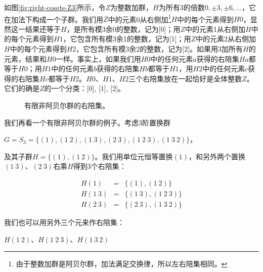 \documentclass[b5paper]{ctexart}
\begin{document}
如图\ref{fig:right-cosets-Z3}所示，令$Z$为整数加群，$H$为所有3的倍数$0, \pm 3, \pm 6, ...$，它在加法下构成一个子群。我们用$Z$中的元素0从右侧加\footnote{由于整数加群是阿贝尔群，加法满足交换律，所以左右陪集相同。}$H$中的每个元素得到$H0$，显然这一结果还等于$H$，是所有模3余0的整数，记为[0]；用$Z$中的元素1从右侧加$H$中的每个元素得到$H1$，它包含所有模3余1的整数，记为[1]；用$Z$中的元素2从右侧加$H$中的每个元素得到$H2$，它包含所有模3余2的整数，记为[2]。如果用3加所有$H$的元素，结果和$H0$一样。事实上，如果我们用$H0$中的任何元素$a$获得的右陪集$Ha$都等于$H0$；用$H1$中的任何元素$b$获得的右陪集$Hb$都等于$H1$，用$H2$中的任何元素$c$获得的右陪集$Hc$都等于$H2$。$H0$、$H1$、$H2$三个右陪集放在一起恰好是全体整数$Z$。它们的确是$Z$的一个分类：[0], [1], [2]。

\begin{figure}[htbp]
\centering
{}
\caption{有限非阿贝尔群的右陪集。}
\label{fig:right-cosets-S3}
\end{figure}

我们再看一个有限非阿贝尔群的例子。考虑3阶置换群

$G = S_3 = \{(1), (1\ 2), (1\ 3), (2\ 3), (1\ 2\ 3), (1\ 3\ 2)\}$，

及其子群$H = \{(1), (1\ 2)\}$。我们用单位元恒等置换$(1)$，和另外两个置换$(1\ 3)$、$(2\ 3)$右乘$H$得到3个右陪集：

\[
\begin{array}{rcl}
H(1) & = & \{(1), (1\ 2)\} \\
H(1\ 3) & = & \{(1\ 3), (1\ 2\ 3)\} \\
H(2\ 3) & = & \{(2\ 3), (1\ 3\ 2)\}
\end{array}
\]

我们也可以用另外三个元来作右陪集：

$H(1\ 2)$、$H(1\ 2\ 3)$、$H(1\ 3\ 2)$
\end{document}

